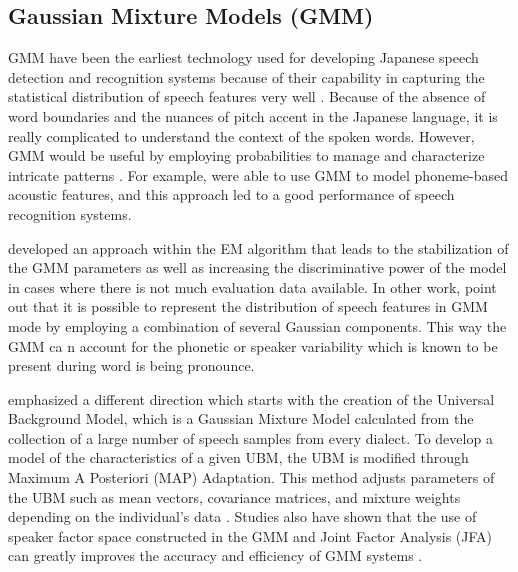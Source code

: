 \subsection{Gaussian Mixture Models (GMM)}
GMM have been the earliest technology used for developing Japanese speech detection and recognition systems because of their capability in capturing the statistical distribution of speech features very well \parencite{Imaishi2022Examination}. Because of the absence of word boundaries and the nuances of pitch accent in the Japanese language, it is really complicated to understand the context of the spoken words. However, GMM would be useful by employing probabilities to manage and characterize intricate patterns \parencite{sun2020subspace}. For example, \textcite{povey2011subspace} were able to use GMM to model phoneme-based acoustic features, and this approach led to a good performance of speech recognition systems.

 \textcite{Imaishi2022Examination} developed an approach within the EM algorithm that leads to the stabilization of the GMM parameters as well as increasing the discriminative power of the model in cases where there is not much evaluation data available. In other work, \textcite{povey2011subspace} point out that it is possible to represent the distribution of speech features in GMM mode by employing a combination of several Gaussian components. This way the GMM ca n account for the phonetic or speaker variability which is known to be present during word is being pronounce.

\textcite{Takami2020Performance} emphasized a different direction which starts with the creation of the Universal Background Model, which is a Gaussian Mixture Model calculated from the collection of a large number of speech samples from every dialect. To develop a model of the characteristics of a given UBM, the UBM is modified through Maximum A Posteriori (MAP) Adaptation. This method adjusts parameters of the UBM such as mean vectors, covariance matrices, and mixture weights depending on the individual’s data \parencite{dehak2009support}. Studies also  have shown that the use of speaker factor space constructed in the GMM and Joint Factor Analysis (JFA) can greatly improves the accuracy and efficiency of GMM systems \parencite{matrouf2011modeling}.

